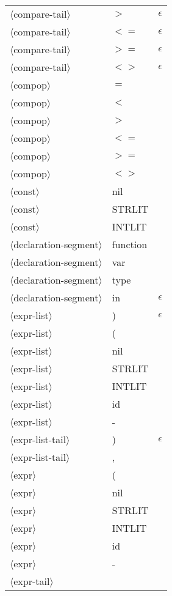 \documentclass[11pt, fleqn]{article}
\newcommand{\atag}[1]{$\langle$#1$\rangle$}
\begin{document}
\begin{longtable}{l|l|l}
\atag{compare-tail}				&	$>$			&	$\epsilon$					\\
\atag{compare-tail}				&	$<=$			&	$\epsilon$					\\
\atag{compare-tail}				&	$>=$			&	$\epsilon$					\\
\atag{compare-tail}				&	$<>$			&	$\epsilon$						\\
\atag{compop}					&	$=$			&									\\
\atag{compop}					&	$<$			&									\\
\atag{compop}					&	$>$			&									\\
\atag{compop}					&	$<=$			&									\\
\atag{compop}					&	$>=$			&									\\
\atag{compop}					&	$<>$			&									\\
\atag{const}						&	nil			&		\\
\atag{const}						&	STRLIT		&		\\
\atag{const}						&	INTLIT		&		\\
\atag{declaration-segment}		&	function		&		\\
\atag{declaration-segment}		&	var			&		\\
\atag{declaration-segment}		&	type			&		\\
\atag{declaration-segment}		&	in			&	$\epsilon$	\\
\atag{expr-list}					&	)			&	$\epsilon$				\\
\atag{expr-list}					&	(			&					\\
\atag{expr-list}					&	nil			&					\\
\atag{expr-list}					&	STRLIT		&					\\
\atag{expr-list}					&	INTLIT			&					\\
\atag{expr-list}					&	id			&					\\
\atag{expr-list}					&	-			&					\\
\atag{expr-list-tail}			&	)			&	$\epsilon$								\\
\atag{expr-list-tail}			&	,			&											\\
\atag{expr}						&	(			&		\\
\atag{expr}						&	nil			&		\\
\atag{expr}						&	STRLIT			&		\\
\atag{expr}						&	INTLIT			&		\\
\atag{expr}						&	id			&		\\
\atag{expr}						&	-			&		\\
\atag{expr-tail}					&	\textbar		&			\\

\end{longtable}
\end{document}
